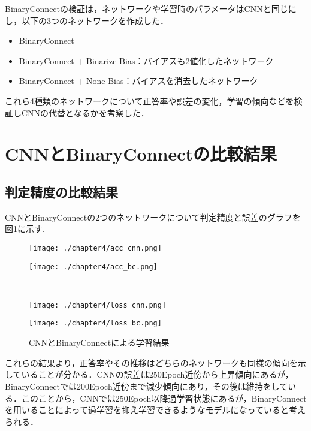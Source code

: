 BinaryConnectの検証は，ネットワークや学習時のパラメータはCNNと同じにし，以下の3つのネットワークを作成した．
\begin{itemize}
  \item BinaryConnect
  \item BinaryConnect + Binarize Bias：バイアスも2値化したネットワーク
  \item BinaryConnect + None Bias：バイアスを消去したネットワーク
\end{itemize}
これら4種類のネットワークについて正答率や誤差の変化，学習の傾向などを検証しCNNの代替となるかを考察した．

\section{CNNとBinaryConnectの比較結果}
\subsection{判定精度の比較結果}
CNNとBinaryConnectの2つのネットワークについて判定精度と誤差のグラフを図\ref{fig_acc_loss_1}に示す.
\begin{figure}[!b]
  \begin{minipage}[b]{0.5\linewidth}
    \centering
    \texttt{[image: ./chapter4/acc\_cnn.png]}
  \end{minipage}
  \begin{minipage}[b]{0.5\linewidth}
    \centering
    \texttt{[image: ./chapter4/acc\_bc.png]}
    \label{fig_acc_bc}
  \end{minipage}\\
  \begin{minipage}[b]{0.5\linewidth}
    \centering
    \texttt{[image: ./chapter4/loss\_cnn.png]}
  \end{minipage}
  \begin{minipage}[b]{0.5\linewidth}
    \centering
    \texttt{[image: ./chapter4/loss\_bc.png]}
  \end{minipage}
  \caption{CNNとBinaryConnectによる学習結果}
  \label{fig_acc_loss_1}
\end{figure}
これらの結果より，正答率やその推移はどちらのネットワークも同様の傾向を示していることが分かる．CNNの誤差は250Epoch近傍から上昇傾向にあるが，BinaryConnectでは200Epoch近傍まで減少傾向にあり，その後は維持をしている．このことから，CNNでは250Epoch以降過学習状態にあるが，BinaryConnectを用いることによって過学習を抑え学習できるようなモデルになっていると考えられる．

